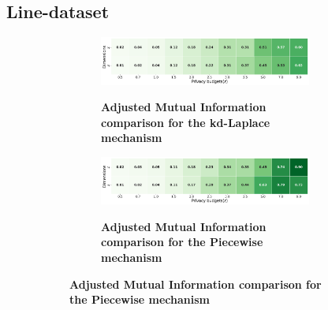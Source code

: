\subsection{Line-dataset}
\begin{figure}[H]
  \centering
  \begin{subfigure}[b]{0.85\textwidth}
    \begin{subfigure}[c]{1\textwidth}
      \caption{\textbf{Adjusted Mutual Information comparison for the kd-Laplace mechanism}}
      \includegraphics[width=1\textwidth]{Results/kd-laplace/kd-Laplace/line-dataset/ami.png}
      \label{fig:ami_line-dataset_comparison_kdlaplace_2d}
    \end{subfigure}
    \vfill %
    \begin{subfigure}[c]{1\textwidth}
      \caption{\textbf{Adjusted Mutual Information comparison for the Piecewise mechanism}}
      \includegraphics[width=1\textwidth]{Results/kd-laplace/piecewise/line-dataset/ami.png}
      \label{fig:ami_line-dataset_comparison_piecewise_2d}
    \end{subfigure}
  \end{subfigure}
  \hfill %
  \begin{subfigure}[b]{0.075\textwidth}

\end{subfigure}
\end{figure}
